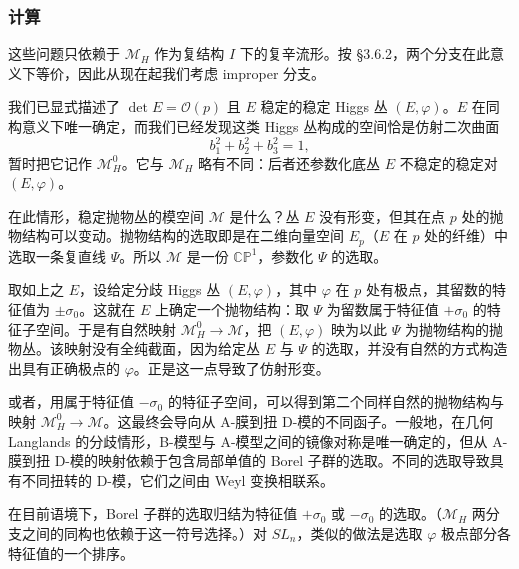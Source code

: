 \documentclass[11pt,a4paper]{article}
\begin{document}
\subsubsection{计算}

这些问题只依赖于 $\mathcal{M}_H$ 作为复结构 $I$ 下的复辛流形。按 §3.6.2，两个分支在此意义下等价，因此从现在起我们考虑 improper 分支。

我们已显式描述了 $\det E=\mathcal{O}(p)$ 且 $E$ 稳定的稳定 Higgs 丛 $(E,\varphi)$。$E$ 在同构意义下唯一确定，而我们已经发现这类 Higgs 丛构成的空间恰是仿射二次曲面
\begin{equation}\tag{3.40}
b_1^2+b_2^2+b_3^2=1,
\end{equation}
暂时把它记作 $\mathcal{M}_H^0$。它与 $\mathcal{M}_H$ 略有不同：后者还参数化底丛 $E$ 不稳定的稳定对 $(E,\varphi)$。

在此情形，稳定抛物丛的模空间 $\mathcal{M}$ 是什么？丛 $E$ 没有形变，但其在点 $p$ 处的抛物结构可以变动。抛物结构的选取即是在二维向量空间 $E_p$（$E$ 在 $p$ 处的纤维）中选取一条复直线 $\Psi$。所以 $\mathcal{M}$ 是一份 $\mathbb{C}\mathbb{P}^1$，参数化 $\Psi$ 的选取。

取如上之 $E$，设给定分歧 Higgs 丛 $(E,\varphi)$，其中 $\varphi$ 在 $p$ 处有极点，其留数的特征值为 $\pm\sigma_0$。这就在 $E$ 上确定一个抛物结构：取 $\Psi$ 为留数属于特征值 $+\sigma_0$ 的特征子空间。于是有自然映射 $\mathcal{M}_H^0\to\mathcal{M}$，把 $(E,\varphi)$ 映为以此 $\Psi$ 为抛物结构的抛物丛。该映射没有全纯截面，因为给定丛 $E$ 与 $\Psi$ 的选取，并没有自然的方式构造出具有正确极点的 $\varphi$。正是这一点导致了仿射形变。

或者，用属于特征值 $-\sigma_0$ 的特征子空间，可以得到第二个同样自然的抛物结构与映射 $\mathcal{M}_H^0\to\mathcal{M}$。这最终会导向从 A-膜到扭 D-模的不同函子。一般地，在几何 Langlands 的分歧情形，B-模型与 A-模型之间的镜像对称是唯一确定的，但从 A-膜到扭 D-模的映射依赖于包含局部单值的 Borel 子群的选取。不同的选取导致具有不同扭转的 D-模，它们之间由 Weyl 变换相联系。

在目前语境下，Borel 子群的选取归结为特征值 $+\sigma_0$ 或 $-\sigma_0$ 的选取。（$\mathcal{M}_H$ 两分支之间的同构也依赖于这一符号选择。）对 $SL_n$，类似的做法是选取 $\varphi$ 极点部分各特征值的一个排序。

\end{document}
